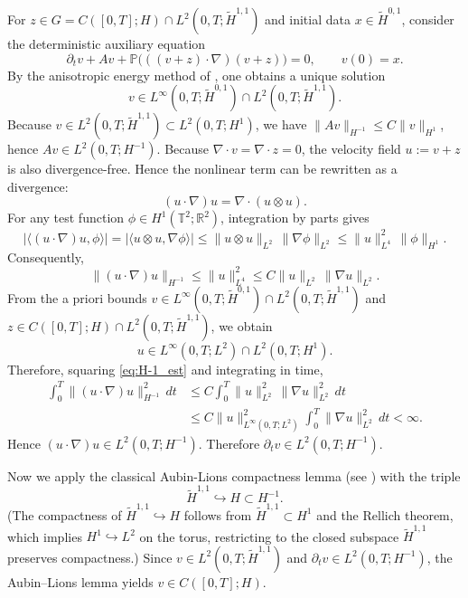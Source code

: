 \documentclass[11pt,a4paper,reqno]{amsart}
\theoremstyle{definition}
\begin{document}
For $z\in G = C([0,T];H)\cap L^2(0,T;\widetilde H^{1,1})$ and initial data
$x\in\widetilde H^{0,1}$, consider the deterministic auxiliary equation
\begin{equation}\label{eq:aux_v}
  \partial_t v + A v + \mathbb P\bigl(((v+z)\cdot\nabla)(v+z)\bigr) = 0,
  \qquad v(0)=x .
\end{equation}
By the anisotropic energy method of \cite{LZZ}, one obtains a unique solution
\[
v \in L^\infty(0,T;\widetilde H^{0,1}) \cap L^2(0,T;\widetilde H^{1,1}) .
\]
Because $v\in L^2(0,T;\widetilde H^{1,1})\subset L^2(0,T;H^1)$,
we have $\|A v\|_{H^{-1}} \le C\|v\|_{H^1}$, hence $A v \in L^2(0,T;H^{-1})$.
  Because $\nabla\cdot v = \nabla\cdot z = 0$, the velocity field
  $u := v+z$ is also divergence-free.  Hence the nonlinear term can be
  rewritten as a divergence:
  \[
    (u\cdot\nabla)u = \nabla\cdot(u\otimes u).
  \]
  For any test function $\phi\in H^1(\mathbb{T}^2;\mathbb{R}^2)$,
  integration by parts gives
  \[
    |\langle (u\cdot\nabla)u, \phi\rangle|
    = |\langle u\otimes u, \nabla\phi\rangle|
    \le \|u\otimes u\|_{L^2}\,\|\nabla\phi\|_{L^2}
    \le \|u\|_{L^4}^2\,\|\phi\|_{H^1}.
  \]
  Consequently,
  \begin{equation}\label{eq:H-1_est}
    \|(u\cdot\nabla)u\|_{H^{-1}} \le \|u\|_{L^4}^2\le C \|u\|_{L^2}\,\|\nabla u\|_{L^2}.
  \end{equation}
 From the a priori bounds
  $v\in L^\infty(0,T;\widetilde H^{0,1})\cap L^2(0,T;\widetilde H^{1,1})$
  and $z\in C([0,T];H)\cap L^2(0,T;\widetilde H^{1,1})$, we obtain
  \[
    u \in L^\infty(0,T;L^2) \cap L^2(0,T;H^1).
  \]
  Therefore, squaring \eqref{eq:H-1_est} and integrating in time,
  \begin{align*}
    \int_0^T \|(u\cdot\nabla)u\|_{H^{-1}}^2\,dt
    &\le C \int_0^T \|u\|_{L^2}^2\,\|\nabla u\|_{L^2}^2\,dt \\
    &\le C \|u\|_{L^\infty(0,T;L^2)}^2 \int_0^T \|\nabla u\|_{L^2}^2\,dt
    < \infty .
  \end{align*}
  Hence $(u\cdot\nabla)u \in L^2(0,T;H^{-1})$. Therefore $\partial_t v \in L^2(0,T;H^{-1})$.

Now we apply the classical Aubin-Lions compactness lemma (see \cite{Temam})
with the triple
\[
\widetilde H^{1,1} \hookrightarrow H \subset H^{-1}.
\]
(The compactness of $\widetilde H^{1,1}\hookrightarrow H$ follows from
$\widetilde H^{1,1}\subset H^1$ and the Rellich theorem, which implies
$H^1 \hookrightarrow L^2$ on the torus, restricting to the closed subspace
$\widetilde H^{1,1}$ preserves compactness.)
Since $v\in L^2(0,T;\widetilde H^{1,1})$ and $\partial_t v \in L^2(0,T;H^{-1})$,
the Aubin--Lions lemma yields $v\in C([0,T];H)$.
\end{document}
